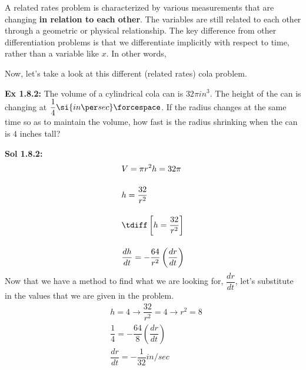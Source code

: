 A related rates problem is characterized by various measurements that are changing \textbf{in relation to each other}. The variables are still related to each other through a geometric or physical relationship. The key difference from other differentiation problems is that we differentiate implicitly with respect to time, rather than a variable like $x$. In other words, 

\begin{center}  
\end{center}

Now, let's take a look at this different (related rates) cola problem.

\begin{tcolorbox}[example]
    \textbf{Ex 1.8.2: } The volume of a cylindrical cola can is $32\pi \si{in^3}$. The height of the can is changing at $\dfrac{1}{4} \si{in \per sec} \forcespace$. If the radius changes at the same time so as to maintain the volume, how fast is the radius shrinking when the can is $4$ inches tall? 
\end{tcolorbox} 
\begin{tcolorbox}[solution]
    \textbf{Sol 1.8.2: } \begin{align*}
        & V = \pi r^2h = 32\pi \\[11pt]
        & h = \dfrac{32}{r^2} \\[11pt]
        & \tdiff\left[h = \dfrac{32}{r^2}\right] \\[11pt]
        & \dfrac{dh}{dt} = -\dfrac{64}{r^2}\left(\dfrac{dr}{dt}\right)
    \end{align*}
    Now that we have a method to find what we are looking for, $\dfrac{dr}{dt}$, let's substitute in the values that we are given in the problem. \begin{align*}
        & h = 4 \rightarrow \dfrac{32}{r^2} = 4 \rightarrow r^2 = 8 \\[11pt]
        & \dfrac{1}{4} = -\dfrac{64}{8}\left(\dfrac{dr}{dt}\right) \\[11pt]
        & \dfrac{dr}{dt} = \boxed{-\dfrac{1}{32} \si{in \per sec}}
    \end{align*}
\end{tcolorbox}

